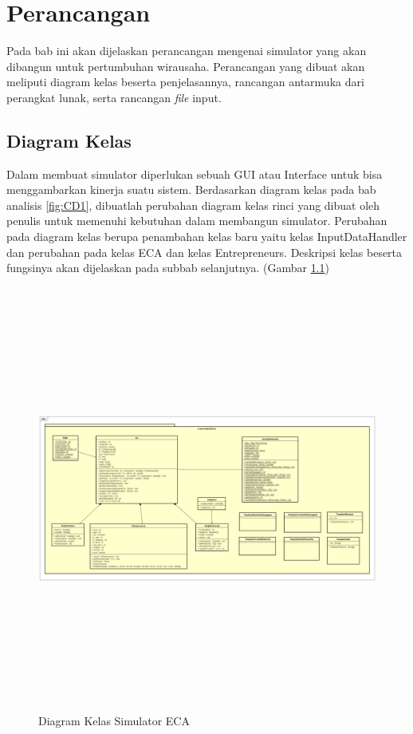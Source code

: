 \chapter{Perancangan}
\label{chap:perancangan}

Pada bab ini akan dijelaskan perancangan mengenai simulator yang akan dibangun untuk pertumbuhan wirausaha. Perancangan yang dibuat akan meliputi diagram kelas beserta penjelasannya, rancangan antarmuka dari perangkat lunak, serta rancangan \textit{file} input.


\section{Diagram Kelas}
\label{sec:perancangankelas}

Dalam membuat simulator diperlukan sebuah GUI atau Interface untuk bisa menggambarkan kinerja suatu sistem. Berdasarkan diagram kelas pada bab analisis \ref{fig:CD1}, dibuatlah perubahan diagram kelas rinci yang dibuat oleh penulis untuk memenuhi kebutuhan dalam membangun simulator. Perubahan pada diagram kelas berupa penambahan kelas baru yaitu kelas InputDataHandler dan perubahan pada kelas ECA dan kelas Entrepreneurs. Deskripsi kelas beserta fungsinya akan dijelaskan pada subbab selanjutnya. (Gambar \ref{fig:classdiagram2})

\begin{figure} [H]
	\centering  
	\includegraphics[width=18cm, height=14cm]{diagramKelas1}
	\caption[Diagram Kelas Simulator ECA]{Diagram Kelas Simulator ECA} 
	\label{fig:classdiagram2} 
\end{figure}

